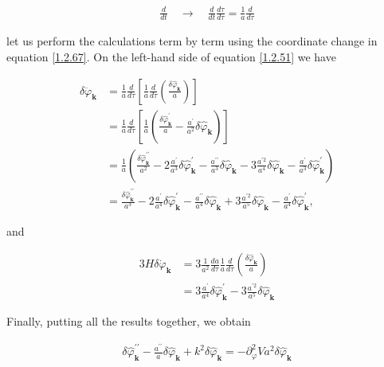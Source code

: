 \begin{align}
    \frac{d}{d t} \quad \longrightarrow \quad \frac{d}{d t} \frac{d \tau}{d \tau}=\frac{1}{a} \frac{d}{d \tau} \label{1.2.67}
\end{align}

let us perform the calculations term by term using the coordinate change in equation \eqref{1.2.67}. On the left-hand side of equation \eqref{1.2.51} we have


\begin{align}
    \delta \ddot{\varphi}_{\mathbf{k}} & =\frac{1}{a} \frac{d}{d \tau}\left[\frac{1}{a} \frac{d}{d \tau}\left(\frac{\delta \hat{\varphi}_{\mathbf{k}}}{a}\right)\right] \\
    & =\frac{1}{a} \frac{d}{d \tau}\left[\frac{1}{a}\left(\frac{\delta \hat{\varphi}_{\mathbf{k}}^{\prime}}{a}-\frac{a^{\prime}}{a^{2}} \delta \hat{\varphi}_{\mathbf{k}}\right)\right] \\
    & =\frac{1}{a}\left(\frac{\delta \hat{\varphi}_{\mathbf{k}}^{\prime \prime}}{a^{2}}-2 \frac{a^{\prime}}{a^{3}} \delta \hat{\varphi}_{\mathbf{k}}^{\prime}-\frac{a^{\prime \prime}}{a^{3}} \delta \hat{\varphi}_{\mathbf{k}}-3 \frac{a^{\prime 2}}{a^{4}} \delta \hat{\varphi}_{\mathbf{k}}-\frac{a^{\prime}}{a^{3}} \delta \hat{\varphi}_{\mathbf{k}}^{\prime}\right) \\
    & =\frac{\delta \hat{\varphi}_{\mathbf{k}}^{\prime \prime}}{a^{3}}-2 \frac{a^{\prime}}{a^{4}} \delta \hat{\varphi}_{\mathbf{k}}^{\prime}-\frac{a^{\prime \prime}}{a^{4}} \delta \hat{\varphi}_{\mathbf{k}}+3 \frac{a^{\prime 2}}{a^{5}} \delta \hat{\varphi}_{\mathbf{k}}-\frac{a^{\prime}}{a^{4}} \delta \hat{\varphi}_{\mathbf{k}}^{\prime},
\end{align}


and


\begin{align}
    3 H \delta \dot{\varphi}_{\mathbf{k}} & =3 \frac{1}{a^{2}} \frac{d a}{d \tau} \frac{1}{a} \frac{d}{d \tau}\left(\frac{\delta \hat{\varphi}_{\mathbf{k}}}{a}\right) \\
    & =3 \frac{a^{\prime}}{a^{4}} \delta \hat{\varphi}_{\mathbf{k}}^{\prime}-3 \frac{a^{\prime 2}}{a^{5}} \delta \hat{\varphi}_{\mathbf{k}}
\end{align}


Finally, putting all the results together, we obtain

\begin{align}
    \delta \hat{\varphi}_{\mathbf{k}}^{\prime \prime}-\frac{a^{\prime \prime}}{a} \delta \hat{\varphi}_{\mathbf{k}}+k^{2} \delta \hat{\varphi}_{\mathbf{k}}=-\partial_{\varphi}^{2} V a^{2} \delta \hat{\varphi}_{\mathbf{k}} \label{1.2.74}
\end{align}

